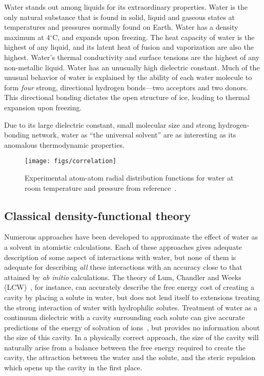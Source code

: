 \documentclass[letterpaper,twocolumn,amsmath,amssymb,prb]{revtex4}
\begin{document}
Water stands out among liquids for its extraordinary properties.  Water is
the only natural substance that is found in solid, liquid and gaseous
states at temperatures and pressures normally found on Earth.  Water has a
density maximum at 4$^\circ$C, and expands upon freezing.  The heat
capacity of water is the highest of any liquid, and its latent heat of
fusion and vaporization are also the highest.  Water's thermal conductivity
and surface tensions are the highest of any non-metallic liquid.  Water has
an unusually high dielectric constant.
Much of the unusual behavior of water is explained by the ability of each
water molecule to form \emph{four} strong, directional hydrogen bonds---two
acceptors and two donors.  This directional bonding dictates the open
structure of ice, leading to thermal expansion upon freezing.

Due to its large dielectric constant, small molecular size and strong
hydrogen-bonding network, water as ``the universal solvent'' are as
interesting as its anomalous thermodynamic properties.

\begin{figure}
\texttt{[image: figs/correlation]}
\caption{ Experimental atom-atom radial distribution functions for water at
room temperature and pressure from reference~\cite{Soper2000}.  }
\label{correlation}
\end{figure}

\subsection{Classical density-functional theory}

Numerous approaches have been developed to approximate the effect of water
as a solvent in atomistic calculations.  Each of these approaches gives
adequate description of some aspect of interactions with water, but none of
them is adequate for describing \emph{all} these interactions with an
accuracy close to that attained by \emph{ab initio} calculations.  The
theory of Lum, Chandler and Weeks (LCW)~\cite{LCW}, for instance, can
accurately describe the free energy cost of creating a cavity by placing a
solute in water, but does not lend itself to extensions treating the strong
interaction of water with hydrophilic solutes.  Treatment of water as a
continuum dielectric with a cavity surrounding each solute can give
accurate predictions of the energy of solvation of ions~\cite{latimer1939,
rashin1985, zhan1998, hsu1999, hildebrandt2004, hildebrandt2007}, but
provides no information about the size of this cavity.  In a physically
correct approach, the size of the cavity will naturally arise from a
balance between the free energy required to create the cavity, the
attraction between the water and the solute, and the steric repulsion which
opens up the cavity in the first place.
\end{document}
